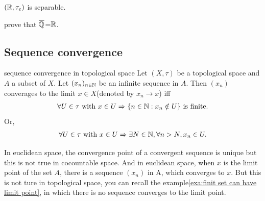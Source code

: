 \begin{example}{}{}
    $(\mathbb{R},\tau_e)$ is separable.
\end{example}
prove that $\overline{\mathbb{Q}}$=$\mathbb{R}$.


\subsection{Sequence convergence}
\begin{definition}{}{sequence convergence in topological space}
    Let $(X,\tau)$ be a topological space and $A$ a subset of $X$. Let $(x_n)_{n\in\mathbb{N}}$ be an infinite sequence in $A$.
    Then $(x_n)$ converages to the limit $x\in X$(denoted by $x_n\rightarrow x$) iff
    \begin{align*}
        \forall U\in \tau \text{ with }  x\in U \Rightarrow \{n\in \mathbb{N}:x_n\notin U\} \text{ is finite}.
    \end{align*}
    Or, 
    \begin{align*}
        \forall U\in \tau \text{ with }  x\in U \Rightarrow \exists N\in \mathbb{N}, \forall n>N, x_n\in U.
    \end{align*}
\end{definition}

In euclidean space,  the convergence point of a convergent sequence is unique but this is not true in cocountable space.
And in euclidean space, when $x$ is the limit point of the set $A$, there is a sequence $(x_n)$ in A, which converges to $x$. 
But this is not ture in topological space, you can recall the example\ref{exa:finit set can have limit point}, 
in which there is no sequence converges to the limit point. 
 
